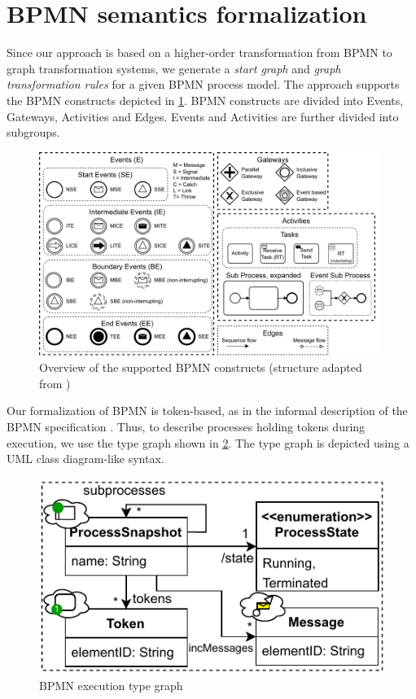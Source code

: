 \documentclass[submission, copyright, creativecommons]{eptcs}
\begin{document}
\section{BPMN semantics formalization} \label{sec:formalization}

Since our approach is based on a higher-order transformation from BPMN to graph transformation systems, we generate a \emph{start graph} and \emph{graph transformation rules} for a given BPMN process model.
The approach supports the BPMN constructs depicted in \cref{fig:bpmnConstructsOverview}.
BPMN constructs are divided into \textsf{Events}, \textsf{Gateways}, \textsf{Activities} and \textsf{Edges}.
\textsf{Events} and \textsf{Activities} are further divided into subgroups.

\begin{figure}[h]
    \centering
    \includegraphics[width=0.99\textwidth]{images/bpmn_semantics-feature-overview.pdf}
    \caption{Overview of the supported BPMN constructs (structure adapted from \cite{houhouFirstOrderLogicVerification2022})}
    \label{fig:bpmnConstructsOverview}
\end{figure}

Our formalization of BPMN is token-based, as in the informal description of the BPMN specification \cite{objectmanagementgroupBusinessProcessModel2013}.
Thus, to describe processes holding tokens during execution, we use the type graph shown in \cref{fig:typeGraph}.
The type graph is depicted using a UML class diagram-like syntax.

\begin{figure}
  \centering
  \includegraphics[width=0.5\linewidth]{images/bpmn_semantics-typegraph.pdf}
  \caption{BPMN execution type graph}
  \label{fig:typeGraph}
\end{figure}
\end{document}
